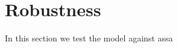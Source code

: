 \documentclass[../document.tex]{subfiles}
\begin{document}
\section{Robustness}
In this section we test the model against assa
\end{document}
